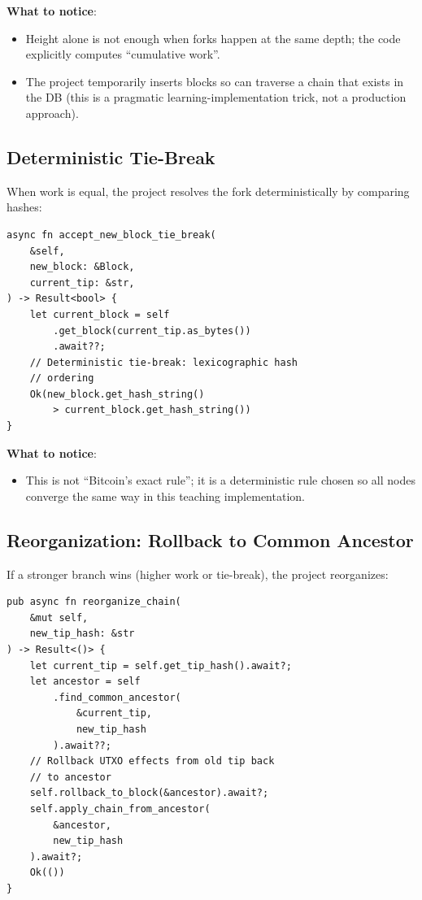 \textbf{What to notice}:
\begin{itemize}
  \item Height alone is not enough when forks happen at the same depth; the code explicitly computes ``cumulative work''.
  \item The project temporarily inserts blocks so  can traverse a chain that exists in the DB (this is a pragmatic learning-implementation trick, not a production approach).
\end{itemize}

\subsection{Deterministic Tie-Break}
\label{sec:ch09-7-tiebreak}

When work is equal, the project resolves the fork deterministically by comparing hashes:

\begin{listing}[htbp]
\caption{Deterministic tie-break (lexicographic hash ordering)}
\label{lst:9-7-9}
\begin{verbatim}
async fn accept_new_block_tie_break(
    &self,
    new_block: &Block,
    current_tip: &str,
) -> Result<bool> {
    let current_block = self
        .get_block(current_tip.as_bytes())
        .await??;
    // Deterministic tie-break: lexicographic hash
    // ordering
    Ok(new_block.get_hash_string()
        > current_block.get_hash_string())
}
\end{verbatim}
\end{listing}

\textbf{What to notice}:
\begin{itemize}
  \item This is not ``Bitcoin's exact rule''; it is a deterministic rule chosen so all nodes converge the same way in this teaching implementation.
\end{itemize}

\subsection{Reorganization: Rollback to Common Ancestor}
\label{sec:ch09-7-reorg}

If a stronger branch wins (higher work or tie-break), the project reorganizes:

\begin{listing}[htbp]
\caption{Reorganization contract (rollback to common ancestor, then apply new branch)}
\label{lst:9-7-10}
\begin{verbatim}
pub async fn reorganize_chain(
    &mut self,
    new_tip_hash: &str
) -> Result<()> {
    let current_tip = self.get_tip_hash().await?;
    let ancestor = self
        .find_common_ancestor(
            &current_tip,
            new_tip_hash
        ).await??;
    // Rollback UTXO effects from old tip back
    // to ancestor
    self.rollback_to_block(&ancestor).await?;
    self.apply_chain_from_ancestor(
        &ancestor,
        new_tip_hash
    ).await?;
    Ok(())
}
\end{verbatim}
\end{listing}

